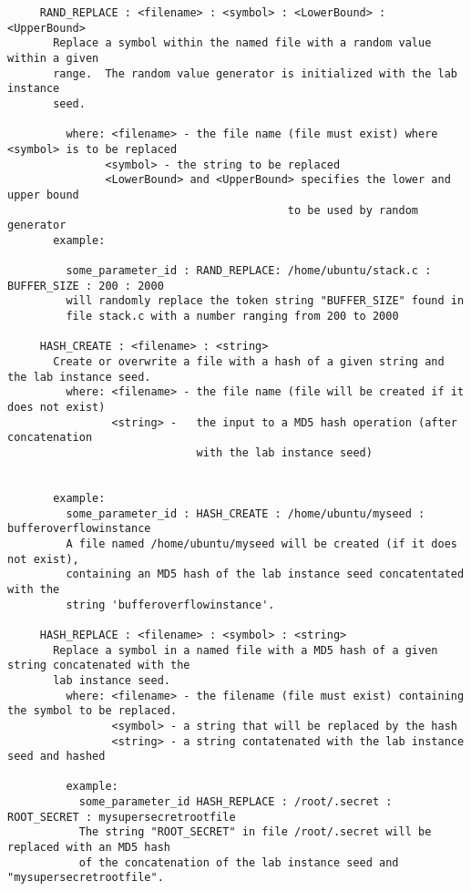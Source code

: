 \documentclass{article}
\begin{document}
\begin{verbatim}
     RAND_REPLACE : <filename> : <symbol> : <LowerBound> : <UpperBound>
       Replace a symbol within the named file with a random value within a given
       range.  The random value generator is initialized with the lab instance
       seed.

         where: <filename> - the file name (file must exist) where <symbol> is to be replaced
               <symbol> - the string to be replaced
               <LowerBound> and <UpperBound> specifies the lower and upper bound
                                           to be used by random generator
       example:

         some_parameter_id : RAND_REPLACE: /home/ubuntu/stack.c : BUFFER_SIZE : 200 : 2000
         will randomly replace the token string "BUFFER_SIZE" found in
         file stack.c with a number ranging from 200 to 2000
 
     HASH_CREATE : <filename> : <string>
       Create or overwrite a file with a hash of a given string and the lab instance seed.
         where: <filename> - the file name (file will be created if it does not exist)
                <string> -   the input to a MD5 hash operation (after concatenation 
                             with the lab instance seed)
                           
                       
       example:
         some_parameter_id : HASH_CREATE : /home/ubuntu/myseed : bufferoverflowinstance
         A file named /home/ubuntu/myseed will be created (if it does not exist), 
         containing an MD5 hash of the lab instance seed concatentated with the 
         string 'bufferoverflowinstance'.
 
     HASH_REPLACE : <filename> : <symbol> : <string>
       Replace a symbol in a named file with a MD5 hash of a given string concatenated with the
       lab instance seed.
         where: <filename> - the filename (file must exist) containing the symbol to be replaced.
                <symbol> - a string that will be replaced by the hash
                <string> - a string contatenated with the lab instance seed and hashed

         example:
           some_parameter_id HASH_REPLACE : /root/.secret : ROOT_SECRET : mysupersecretrootfile
           The string "ROOT_SECRET" in file /root/.secret will be replaced with an MD5 hash
           of the concatenation of the lab instance seed and "mysupersecretrootfile".
\end{verbatim}
\end{document}
